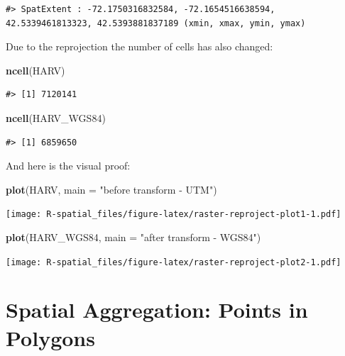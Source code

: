 \documentclass[
]{book}
\newenvironment{Shaded}{\begin{snugshade}}{\end{snugshade}}
\newcommand{\AttributeTok}[1]{\textcolor[rgb]{0.13,0.29,0.53}{#1}}
\newcommand{\FunctionTok}[1]{\textcolor[rgb]{0.13,0.29,0.53}{\textbf{#1}}}
\newcommand{\NormalTok}[1]{#1}
\newcommand{\StringTok}[1]{\textcolor[rgb]{0.31,0.60,0.02}{#1}}
\begin{document}
\begin{verbatim}
#> SpatExtent : -72.1750316832584, -72.1654516638594, 42.5339461813323, 42.5393881837189 (xmin, xmax, ymin, ymax)
\end{verbatim}

Due to the reprojection the number of cells has also changed:

\begin{Shaded}
\begin{Highlighting}[]
\FunctionTok{ncell}\NormalTok{(HARV)}
\end{Highlighting}
\end{Shaded}

\begin{verbatim}
#> [1] 7120141
\end{verbatim}

\begin{Shaded}
\begin{Highlighting}[]
\FunctionTok{ncell}\NormalTok{(HARV\_WGS84)}
\end{Highlighting}
\end{Shaded}

\begin{verbatim}
#> [1] 6859650
\end{verbatim}

And here is the visual proof:

\begin{Shaded}
\begin{Highlighting}[]
\FunctionTok{plot}\NormalTok{(HARV, }\AttributeTok{main =} \StringTok{"before transform {-} UTM"}\NormalTok{)}
\end{Highlighting}
\end{Shaded}

\texttt{[image: R-spatial\_files/figure-latex/raster-reproject-plot1-1.pdf]}

\begin{Shaded}
\begin{Highlighting}[]
\FunctionTok{plot}\NormalTok{(HARV\_WGS84, }\AttributeTok{main =} \StringTok{"after transform {-} WGS84"}\NormalTok{)}
\end{Highlighting}
\end{Shaded}

\texttt{[image: R-spatial\_files/figure-latex/raster-reproject-plot2-1.pdf]}

\hypertarget{spatial-aggregation-points-in-polygons}{%
\section{Spatial Aggregation: Points in Polygons}\label{spatial-aggregation-points-in-polygons}}
\end{document}
